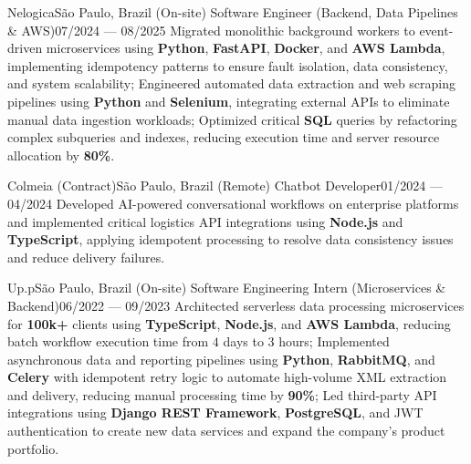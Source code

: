 \resumeSubheading
{Nelogica}{São Paulo, Brazil (On-site)}
{Software Engineer (Backend, Data Pipelines \& AWS)}{07/2024 --- 08/2025}
\resumeItemListStart
\resumeItemShort
{Migrated monolithic background workers to event-driven microservices using \textbf{Python}, \textbf{FastAPI}, \textbf{Docker}, and \textbf{AWS Lambda}, implementing idempotency patterns to ensure fault isolation, data consistency, and system scalability;}
\resumeItemShort
{Engineered automated data extraction and web scraping pipelines using \textbf{Python} and \textbf{Selenium}, integrating external APIs to eliminate manual data ingestion workloads;}
\resumeItemShort
{Optimized critical \textbf{SQL} queries by refactoring complex subqueries and indexes, reducing execution time and server resource allocation by \textbf{80\%}.}
\resumeItemListEnd

\resumeSubheading
{Colmeia (Contract)}{São Paulo, Brazil (Remote)}
{Chatbot Developer}{01/2024 --- 04/2024}
\resumeItemListStart
\resumeItemShort
{Developed AI-powered conversational workflows on enterprise platforms and implemented critical logistics API integrations using \textbf{Node.js} and \textbf{TypeScript}, applying idempotent processing to resolve data consistency issues and reduce delivery failures.}
\resumeItemListEnd

\resumeSubheading
{Up.p}{São Paulo, Brazil (On-site)}
{Software Engineering Intern (Microservices \& Backend)}{06/2022 --- 09/2023}
\resumeItemListStart
\resumeItemShort
{Architected serverless data processing microservices for \textbf{100k+} clients using \textbf{TypeScript}, \textbf{Node.js}, and \textbf{AWS Lambda}, reducing batch workflow execution time from $4$ days to $3$ hours;}
\resumeItemShort
{Implemented asynchronous data and reporting pipelines using \textbf{Python}, \textbf{RabbitMQ}, and \textbf{Celery} with idempotent retry logic to automate high-volume XML extraction and delivery, reducing manual processing time by \textbf{90\%};}
\resumeItemShort
{Led third-party API integrations using \textbf{Django REST Framework}, \textbf{PostgreSQL}, and JWT authentication to create new data services and expand the company's product portfolio.}
\resumeItemListEnd

\resumeSubHeadingListEnd
